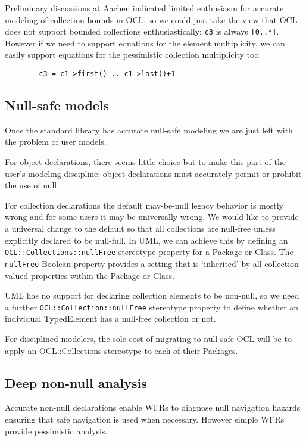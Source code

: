 \documentclass{llncs}
\begin{document}
Preliminary discussions at Aachen\cite{aachen} indicated limited enthusiasm for accurate modeling of collection bounds in OCL, so we could just take the view that OCL does not support bounded collections enthusiastically; \verb$c3$ is always \verb$[0..*]$. However if we need to support equations for the element multiplicity, we can easily support equations for the pessimistic collection multiplicity too. 

\begin{verbatim}
        c3 = c1->first() .. c1->last()+1
\end{verbatim}

\subsection{Null-safe models}    
      
Once the standard library has accurate null-safe modeling we are just left with the problem of user models.

For object declarations, there seems little choice but to make this part of the user's modeling discipline; object declarations must accurately permit or prohibit the use of null.

For collection declarations the default may-be-null legacy behavior is mostly wrong and for some users it may be universally wrong. We would like to provide a universal change to the default so that all collections are null-free unless explicitly declared to be null-full. In UML, we can achieve this by defining an \verb$OCL::Collections::nullFree$ stereotype property for a Package or Class. The \verb$nullFree$ Boolean property provides a setting that is `inherited' by all collection-valued properties within the Package or Class.

UML has no support for declaring collection elements to be non-null, so we need a further \verb$OCL::Collection::nullFree$ stereotype property to define whether an individual TypedElement has a null-free collection or not.

For disciplined modelers, the sole cost of migrating to null-safe OCL will be to apply an OCL::Collections stereotype to each of their Packages.

\subsection{Deep non-null analysis}

Accurate non-null declarations enable WFRs to diagnose null navigation hazards ensuring that safe navigation is used when necessary. However simple WFRs provide pessimistic analysis.
\end{document}
